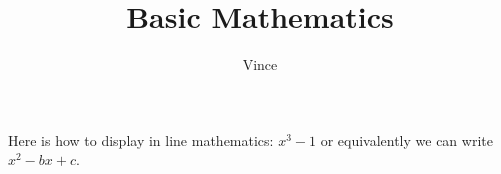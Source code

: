 \documentclass{article}
\title{Basic Mathematics}
\author{Vince}
\begin{document}
\maketitle

Here is how to display in line mathematics: $x^3 - 1$ or equivalently we can write \(x^2 - bx + c\).
\end{document}
